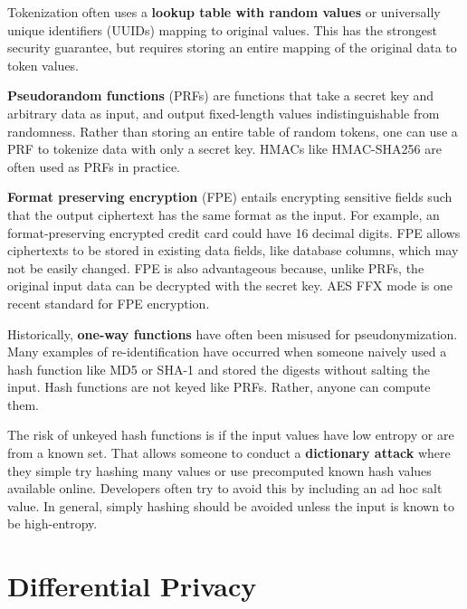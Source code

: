 \documentclass[nobib]{tufte-handout}
\begin{document}
Tokenization often uses a \textbf{lookup table with random values} or
universally unique identifiers (UUIDs) mapping to original values. This has the
strongest security guarantee, but requires storing an entire mapping of the
original data to token values.

\textbf{Pseudorandom functions} (PRFs) are functions that take a secret key and
arbitrary data as input, and output fixed-length values indistinguishable from
randomness. Rather than storing an entire table of random tokens, one can use a
PRF to tokenize data with only a secret key. HMACs like HMAC-SHA256 are often
used as PRFs in practice.

\textbf{Format preserving encryption} \cite{DBLP:conf/sacrypt/BellareRRS09}
(FPE) entails encrypting sensitive fields such that the output ciphertext has
the same format as the input. For example, an format-preserving encrypted credit
card could have 16 decimal digits. FPE allows ciphertexts to be stored in
existing data fields, like database columns, which may not be easily changed.
FPE is also advantageous because, unlike PRFs, the original input data can be
decrypted with the secret key. AES FFX mode \cite{dworkin2016recommendation}
is one recent standard for FPE encryption.


Historically, \textbf{one-way functions} have often been misused for
pseudonymization. Many examples of re-identification have occurred when someone
naively used a hash function like MD5 or SHA-1 and stored the digests without
salting the input. Hash functions are not keyed like PRFs. Rather, anyone can
compute them.

The risk of unkeyed hash functions is if the input values have low entropy or
are from a known set. That allows someone to conduct a \textbf{dictionary
attack} where they simple try hashing many values or use precomputed known hash
values available online. Developers often try to avoid this by including an ad
hoc salt value. In general, simply hashing should be avoided unless the input is
known to be high-entropy.

\section{Differential Privacy}
\end{document}

